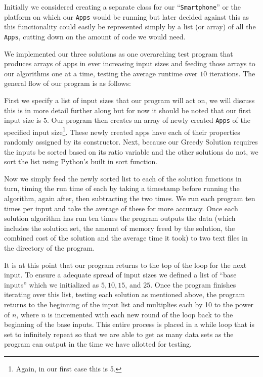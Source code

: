 \documentclass{article}
\begin{document}
Initially we considered creating a separate class for our ``\texttt{Smartphone}'' or the platform on which our \texttt{Apps} would be running but later decided against this as this functionality could easily be represented simply by a list (or array) of all the \texttt{Apps}, cutting down on the amount of code we would need.

We implemented our three solutions as one overarching test program that produces arrays of apps in ever increasing input sizes and feeding those arrays to our algorithms one at a time, testing the average runtime over $10$ iterations. The general flow of our program is as follows:

First we specify a list of input sizes that our program will act on, we will discuss this is in more detail further along but for now it should be noted that our first input size is $5$. Our program then creates an array of newly created \texttt{Apps} of the specified input size\footnote{Again, in our first case this is 5.}. These newly created apps have each of their properties randomly assigned by its constructor. Next, because our Greedy Solution requires the inputs be sorted based on its ratio variable and the other solutions do not, we sort the list using Python’s built in sort function.

Now we simply feed the newly sorted list to each of the solution functions in turn, timing the run time of each by taking a timestamp before running the algorithm, again after, then subtracting the two times. We run each program ten times per input and take the average of these for more accuracy. Once each solution algorithm has run ten times the program outputs the data (which includes the solution set, the amount of memory freed by the solution, the combined cost of the solution and the average time it took) to two text files in the directory of the program.

It is at this point that our program returns to the top of the loop for the next input. To ensure a adequate spread of input sizes we defined a list of “base inputs” which we initialized as $5, 10, 15$, and $25$. Once the program finishes iterating over this list, testing each solution as mentioned above, the program returns to the beginning of the input list and multiplies each by 10 to the power of $n$, where $n$ is incremented with each new round of the loop back to the beginning of the base inputs. This entire process is placed in a while loop that is set to infinitely repeat so that we are able to get as many data sets as the program can output in the time we have allotted for testing.
\end{document}
